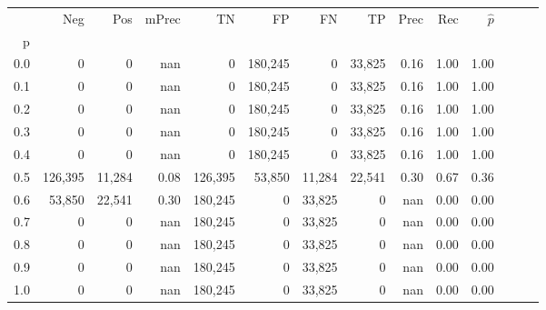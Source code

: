 \begin{tabular}{rrrrrrrrrrrrrr}
\toprule
{} &      Neg &     Pos & mPrec &       TN &       FP &      FN &      TP &  Prec &   Rec & $\hat{p}$ \\
p   &          &         &       &          &          &         &         &       &       &           \\
\midrule
0.0 &        0 &       0 &   nan &        0 &  180,245 &       0 &  33,825 &  0.16 &  1.00 &      1.00 \\
0.1 &        0 &       0 &   nan &        0 &  180,245 &       0 &  33,825 &  0.16 &  1.00 &      1.00 \\
0.2 &        0 &       0 &   nan &        0 &  180,245 &       0 &  33,825 &  0.16 &  1.00 &      1.00 \\
0.3 &        0 &       0 &   nan &        0 &  180,245 &       0 &  33,825 &  0.16 &  1.00 &      1.00 \\
0.4 &        0 &       0 &   nan &        0 &  180,245 &       0 &  33,825 &  0.16 &  1.00 &      1.00 \\
0.5 &  126,395 &  11,284 &  0.08 &  126,395 &   53,850 &  11,284 &  22,541 &  0.30 &  0.67 &      0.36 \\
0.6 &   53,850 &  22,541 &  0.30 &  180,245 &        0 &  33,825 &       0 &   nan &  0.00 &      0.00 \\
0.7 &        0 &       0 &   nan &  180,245 &        0 &  33,825 &       0 &   nan &  0.00 &      0.00 \\
0.8 &        0 &       0 &   nan &  180,245 &        0 &  33,825 &       0 &   nan &  0.00 &      0.00 \\
0.9 &        0 &       0 &   nan &  180,245 &        0 &  33,825 &       0 &   nan &  0.00 &      0.00 \\
1.0 &        0 &       0 &   nan &  180,245 &        0 &  33,825 &       0 &   nan &  0.00 &      0.00 \\
\bottomrule
\end{tabular}

